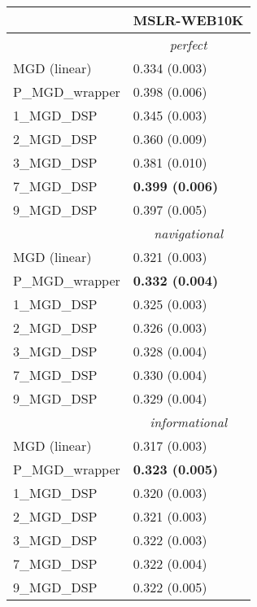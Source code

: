 \begin{tabular*}{\textwidth}{@{\extracolsep{\fill} } l  l  }
\toprule
 & { \small \textbf{MSLR-WEB10K}} \\
\midrule
& \multicolumn{1}{|c|}{\textit{perfect}} \\
\midrule
MGD (linear) & 0.334 {\tiny (0.003)} \\
P\_MGD\_wrapper & 0.398 {\tiny (0.006)} \\
1\_MGD\_DSP & 0.345 {\tiny (0.003)} \\
2\_MGD\_DSP & 0.360 {\tiny (0.009)} \\
3\_MGD\_DSP & 0.381 {\tiny (0.010)} \\
7\_MGD\_DSP & \bf 0.399 {\tiny (0.006)} \\
9\_MGD\_DSP & 0.397 {\tiny (0.005)} \\
\midrule
& \multicolumn{1}{|c|}{\textit{navigational}} \\
\midrule
MGD (linear) & 0.321 {\tiny (0.003)} \\
P\_MGD\_wrapper & \bf 0.332 {\tiny (0.004)} \\
1\_MGD\_DSP & 0.325 {\tiny (0.003)} \\
2\_MGD\_DSP & 0.326 {\tiny (0.003)} \\
3\_MGD\_DSP & 0.328 {\tiny (0.004)} \\
7\_MGD\_DSP & 0.330 {\tiny (0.004)} \\
9\_MGD\_DSP & 0.329 {\tiny (0.004)} \\
\midrule
& \multicolumn{1}{|c|}{\textit{informational}} \\
\midrule
MGD (linear) & 0.317 {\tiny (0.003)} \\
P\_MGD\_wrapper & \bf 0.323 {\tiny (0.005)} \\
1\_MGD\_DSP & 0.320 {\tiny (0.003)} \\
2\_MGD\_DSP & 0.321 {\tiny (0.003)} \\
3\_MGD\_DSP & 0.322 {\tiny (0.003)} \\
7\_MGD\_DSP & 0.322 {\tiny (0.004)} \\
9\_MGD\_DSP & 0.322 {\tiny (0.005)} \\
\bottomrule
\end{tabular*}
